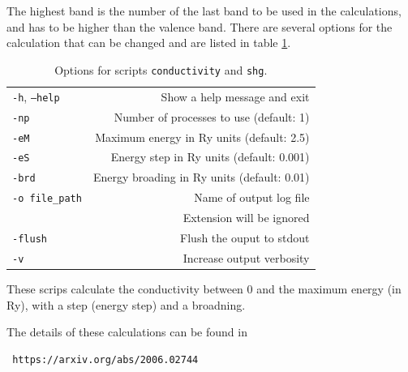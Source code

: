 \documentclass[a4paper,12pt]{report}
\begin{document}
The highest band is the number of the last band to be used in the calculations,
and has to be higher than the valence band.
There are several options for the calculation that can be changed and are listed in
table \ref{tab:options_conductivity}.


\begin{table}[h]
 \centering
 \caption{Options for scripts \texttt{conductivity} and \texttt{shg}.}\label{tab:options_conductivity}
\begin{tabular}[]{lr}
\hline
  \texttt{-h}, \texttt{--help}  & Show a help message and exit \\
  \texttt{-np}                  & Number of processes to use (default: 1) \\
  \texttt{-eM}                  & Maximum energy in Ry units (default: 2.5) \\
  \texttt{-eS}                  & Energy step in Ry units (default: 0.001) \\
  \texttt{-brd}                 & Energy broading in Ry units (default: 0.01) \\
  \texttt{-o file\_path}        & Name of output log file\\
                                & Extension will be ignored\\
  \texttt{-flush}               & Flush the ouput to stdout \\
  \texttt{-v}                   & Increase output verbosity \\
  \hline
\end{tabular}
\end{table}

These scrips calculate the conductivity between 0 and the maximum energy (in Ry),
with a step (energy step) and a broadning.

The details of these calculations can be found in
\begin{verbatim}
 https://arxiv.org/abs/2006.02744
\end{verbatim}
\end{document}
